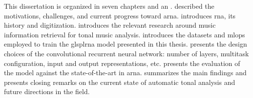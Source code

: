 
This dissertation is organized in seven chapters and an
.
 described the motivations,
challenges, and current progress toward \gls{arna}.
 introduces
\gls{rna}, its history and digitization.
 introduces the relevant research around
music information retrieval for tonal music analysis.
 introduces the
datasets and \gls{mlops} employed to train the glspl{rna}
model presented in this thesis. 
presents the design choices of the convolutional recurrent
neural network: number of layers, multitask configuration,
input and output representations, etc.
 presents the evaluation of
the model against the state-of-the-art in \gls{arna}.
 summarizes the main findings and
presents closing remarks on the current state of automatic
tonal analysis and future directions in the field.
